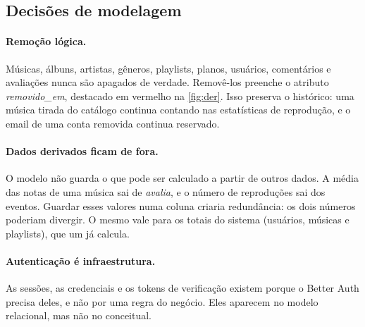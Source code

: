 \FloatBarrier
\subsection{Decisões de modelagem}

\paragraph{Remoção lógica.} Músicas, álbuns, artistas, gêneros, playlists,
planos, usuários, comentários e avaliações nunca são apagados de verdade.
Removê-los preenche o atributo \emph{removido\_em}, destacado em vermelho na
\cref{fig:der}. Isso preserva o histórico: uma música tirada do catálogo
continua contando nas estatísticas de reprodução, e o email de uma conta
removida continua reservado.

\paragraph{Dados derivados ficam de fora.} O modelo não guarda o que pode ser
calculado a partir de outros dados. A média das notas de uma música sai de
\emph{avalia}, e o número de reproduções sai dos eventos. Guardar esses valores
numa coluna criaria redundância: os dois números poderiam divergir. O mesmo
vale para os totais do sistema (usuários, músicas e playlists), que um
 já calcula.

\paragraph{Autenticação é infraestrutura.} As sessões, as credenciais e os
tokens de verificação existem porque o Better Auth precisa deles, e não por
uma regra do negócio. Eles aparecem no modelo relacional, mas não no
conceitual.

